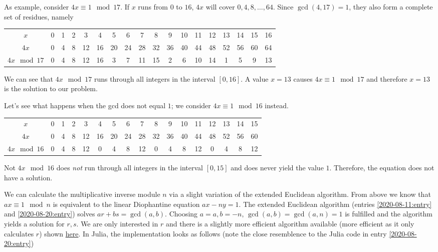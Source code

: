 As example, consider $4x \equiv 1 \mod 17$. If $x$ runs from $0$ to $16$, $4x$ will cover $0, 4, 8,\ldots, 64$. Since $\gcd(4, 17)=1$, they also form a complete set of residues, namely

\vspace*{3mm}

\begin{tabular}{c|ccccccccccccccccc}
 $x$ & 0 & 1& 2& 3& 4& 5& 6& 7& 8& 9& 10& 11& 12& 13& 14& 15& 16 \\
 $4x$ & 0& 4& 8& 12& 16& 20& 24& 28& 32& 36& 40& 44& 48& 52& 56& 60& 64 \\
 $4x \mod 17$ & 0& 4& 8& 12& 16& 3& 7& 11& 15& 2& 6& 10& 14& 1& 5& 9& 13 \\
\end{tabular}

\vspace*{3mm}

We can see that $4x \mod 17$ runs through all integers in the interval $[0, 16]$. A value $x = 13$ causes $4x \equiv 1 \mod 17$ and therefore $x = 13$ is the solution to our problem.

Let's see what happens when the gcd does not equal $1$; we consider $4x \equiv 1 \mod 16$ instead.

\vspace*{3mm}

\begin{tabular}{c|cccccccccccccccc}
 $x$ & 0& 1& 2& 3& 4& 5& 6& 7& 8& 9& 10& 11& 12& 13& 14& 15 \\
 $4x$ & 0& 4& 8& 12& 16& 20& 24& 28& 32& 36& 40& 44& 48& 52& 56& 60 \\
 $4x \mod 16$ & 0& 4& 8& 12& 0& 4& 8& 12& 0& 4& 8& 12& 0& 4& 8& 12 \\
\end{tabular}

\vspace*{3mm}

Not $4x \mod 16$ does \emph{not} run through all integers in the interval $[0, 15]$ and does never yield the value $1$. Therefore, the equation does not have a solution.

We can calculate the multiplicative inverse module $n$ via a slight variation of the extended Euclidean algorithm. From above we know that $ax \equiv 1 \mod n$ is equivalent to the linear Diophantine equation $ax - ny = 1$. The extended Euclidean algorithm (entries \ref{2020-08-11:entry} and \ref{2020-08-20:entry}) solves $ar + bs = \gcd(a,b)$. Choosing $a = a, b = -n$, $\gcd(a,b) = \gcd(a, n) = 1$ is fulfilled and the algorithm yields a solution for $r,s$. We are only interested in $r$ and there is a slightly more efficient algorithm available (more efficient as it only calculates $r$) shown \href{https://en.wikipedia.org/wiki/Extended_Euclidean_algorithm}{here}. In Julia, the implementation looks as follows (note the close resemblence to the Julia code in entry \ref{2020-08-20:entry})

